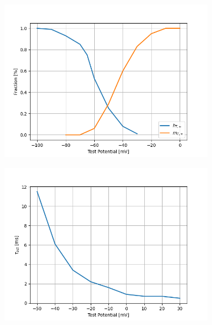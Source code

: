 \documentclass[../main.tex]{subfiles}
\begin{document}
\begin{figure}[!t]
    \centering
    \begin{subfigure}[t]{0.45\textwidth}
        \centering
        \includegraphics[width=\textwidth]{../../reports/workflow/img/t_type_calcium_channel/1_activation_and_inactivation_curves.png}
        \caption{}
    \end{subfigure}
    \hfill
    \begin{subfigure}[t]{0.45\textwidth}
        \centering
        \includegraphics[width=\textwidth]{../../reports/workflow/img/t_type_calcium_channel/2_1_tau_m_jeong.png}
        \caption{}
    \end{subfigure}
    

\end{figure}
\end{document}
